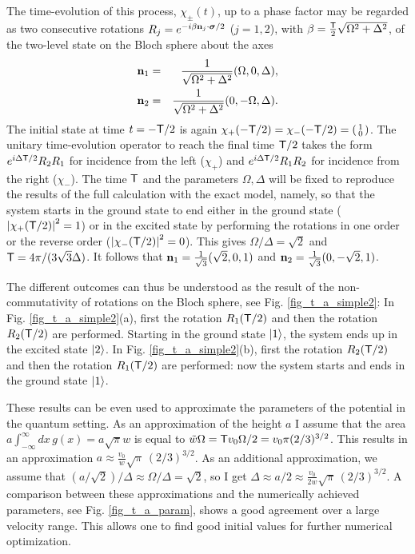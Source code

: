 The time-evolution of this process, $\chi_\pm (t)$,
up to a phase factor may be regarded as
two consecutive rotations $R_j=e^{-i{\beta}{\bf n}_j\cdot {\boldsymbol{\sigma}}/2}$ ($j=1,2$), with $\beta=\frac{{\sf T}}{2}\sqrt{\Omega^2+\Delta^2}$, of the two-level state on the Bloch sphere about the axes
%
\begin{eqnarray}
  {\bf n}_1&=&\frac{1}{\sqrt{\Omega^2+\Delta^2}}(\Omega,0,\Delta), %
  \\
  {\bf n}_2&=&\frac{1}{\sqrt{\Omega^2+\Delta^2}}(0,-\Omega,\Delta). %
\end{eqnarray}
%
The initial state at time $t=-{\sf T}/2$ is again $\chi_+ (-{\sf T}/2) = \chi_- (-{\sf T}/2) =\left(\begin{smallmatrix} 1\\ 0\end{smallmatrix}\right)$.
The unitary time-evolution operator to reach the final time ${\sf T}/2$ takes the form
$e^{i\Delta {\sf T}/2}R_2 R_1$ for  incidence from the left ($\chi_+$) and
$e^{i\Delta {\sf T}/2}R_1 R_2$ for incidence from the right ($\chi_-$).
The time ${\sf T}$ and the parameters $\Omega, \Delta$ will be fixed to reproduce the results of the full calculation with the exact model, namely,
so that the system starts in the ground state to end either in the ground state
($\left| \chi_{+} ({\sf T}/2) \right|^2 = 1$)
or in the excited state by performing the rotations in one order or the reverse order
($\left| \chi_{-} ({\sf T}/2) \right|^2 = 0$). This gives $\Omega/\Delta = \sqrt{2}$ and ${\sf T}= 4\pi/(3 \sqrt{3} \Delta)$. It follows that ${\bf n}_1=\frac{1}{\sqrt{3}}(\sqrt{2},0,1)$ and ${\bf n}_2=\frac{1}{\sqrt{3}}(0,-\sqrt{2},1)$.

The different outcomes can thus be understood as the result of the \linebreak non-commutativity of rotations on the Bloch sphere, see
Fig. \ref{fig_t_a_simple2}: In Fig. \ref{fig_t_a_simple2}(a), first the rotation $R_1({\sf T}/2)$ and then the rotation $R_2({\sf T}/2)$ are performed. Starting in the ground state $\ket{1}$, the system ends up  in the excited state $\ket{2}$.
In Fig. \ref{fig_t_a_simple2}(b),  first the rotation $R_2({\sf T}/2)$ and then the rotation $R_1({\sf T}/2)$ are performed:  now the system starts and ends  in the ground state $\ket{1}$.

These results can be even used to approximate the parameters of the potential in the quantum setting.
As an approximation of the height $a$ I assume that the area $a \int_{-\infty}^\infty dx \, g(x) = a \sqrt{\pi} w$
is equal to $\tilde w \Omega = {{\sf T}} v_0 \Omega/2 =
v_0 \pi ({2}/{3})^{3/2}$. This results in an
approximation $a \approx \frac{v_0}{w} \sqrt{\pi}\, ({2}/{3})^{3/2}$. As an additional approximation, we
assume that $(a/\sqrt{2})/\Delta \approx {\Omega}/{\Delta} = \sqrt{2}$, so I get
$\Delta \approx a/2 \approx \frac{v_0}{2 w} \sqrt{\pi}\, ({2}/{3})^{3/2}$. A comparison between
these approximations and the numerically achieved parameters, see Fig. \ref{fig_t_a_param}, shows a good agreement
over a large velocity range. This allows one to find good initial values for further numerical optimization.

